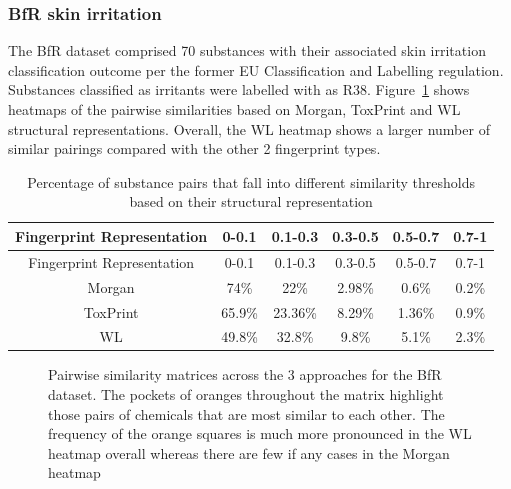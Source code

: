 \documentclass[
  super,
  preprint,
  3p]{elsarticle}
\begin{document}
\subsubsection{BfR skin irritation}\label{bfr-skin-irritation}

The BfR dataset comprised 70 substances with their associated skin
irritation classification outcome per the former EU Classification and
Labelling regulation. Substances classified as irritants were labelled
with as R38. Figure~\ref{fig-bfr} shows heatmaps of the pairwise
similarities based on Morgan, ToxPrint and WL structural
representations. Overall, the WL heatmap shows a larger number of
similar pairings compared with the other 2 fingerprint types.

\begin{longtable}[]{@{}cccccc@{}}
\caption{Percentage of substance pairs that fall into different
similarity thresholds based on their structural
representation}\tabularnewline
\toprule\noalign{}
Fingerprint Representation & 0-0.1 & 0.1-0.3 & 0.3-0.5 & 0.5-0.7 &
0.7-1 \\
\midrule\noalign{}
\endfirsthead
\toprule\noalign{}
Fingerprint Representation & 0-0.1 & 0.1-0.3 & 0.3-0.5 & 0.5-0.7 &
0.7-1 \\
\midrule\noalign{}
\endhead
\bottomrule\noalign{}
\endlastfoot
Morgan & 74\% & 22\% & 2.98\% & 0.6\% & 0.2\% \\
ToxPrint & 65.9\% & 23.36\% & 8.29\% & 1.36\% & 0.9\% \\
WL & 49.8\% & 32.8\% & 9.8\% & 5.1\% & 2.3\% \\
\end{longtable}

\begin{figure}


\caption{\label{fig-bfr}Pairwise similarity matrices across the 3
approaches for the BfR dataset. The pockets of oranges throughout the
matrix highlight those pairs of chemicals that are most similar to each
other. The frequency of the orange squares is much more pronounced in
the WL heatmap overall whereas there are few if any cases in the Morgan
heatmap}

\end{figure}%
\end{document}

